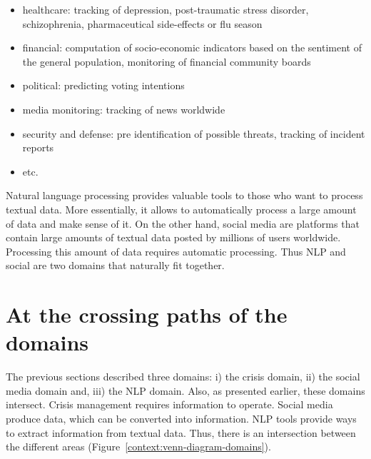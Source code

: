 \begin{itemize}
    \item healthcare: tracking of depression, post-traumatic stress disorder, schizophrenia, pharmaceutical side-effects or flu season
    \item financial: computation of socio-economic indicators based on the sentiment of the general population, monitoring of financial community boards
    \item political: predicting voting intentions
    \item media monitoring: tracking of news worldwide
    \item security and defense: pre identification of possible threats, tracking of incident reports
    \item etc.
\end{itemize}

Natural language processing provides valuable tools to those who want to process textual data.
More essentially, it allows to automatically process a large amount of data and make sense of it.
On the other hand, social media are platforms that contain large amounts of textual data posted by millions of users worldwide.
Processing this amount of data requires automatic processing.
Thus NLP and social are two domains that naturally fit together.

\section{At the crossing paths of the domains}
\label{sec:academic-domains}
The previous sections described three domains: i) the crisis domain, ii) the social media domain and, iii) the NLP domain.
Also, as presented earlier, these domains intersect.
Crisis management requires information to operate.
Social media produce data, which can be converted into information.
NLP tools provide ways to extract information from textual data.
Thus, there is an intersection between the different areas (Figure~\ref{context:venn-diagram-domains}).

